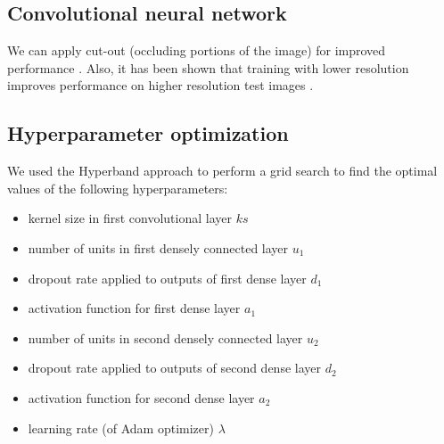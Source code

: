\documentclass[Journal,letterpaper, SingleSpace, InsideFigs]{ascelike-new}
\begin{document}
\subsection{Convolutional neural network}

We can apply cut-out (occluding portions of the image) for improved performance \cite{devries2017improved}. Also, it has been shown that training with lower resolution improves performance on higher resolution test images \cite{touvron2019fixing}.


\subsection{Hyperparameter optimization}
We used the Hyperband approach \cite{li2018hyperband} to perform a grid search to find the optimal values of the following hyperparameters:
\begin{itemize}
    \item kernel size in first convolutional layer $ks$
    \item number of units in first densely connected layer $u_1$
    \item dropout rate applied to outputs of first dense layer $d_1$
    \item activation function for first dense layer $a_1$
    \item number of units in second densely connected layer $u_2$
    \item dropout rate applied to outputs of second dense layer $d_2$
    \item activation function for second dense layer $a_2$
    \item learning rate (of Adam optimizer) $\lambda$
\end{itemize}
\end{document}
